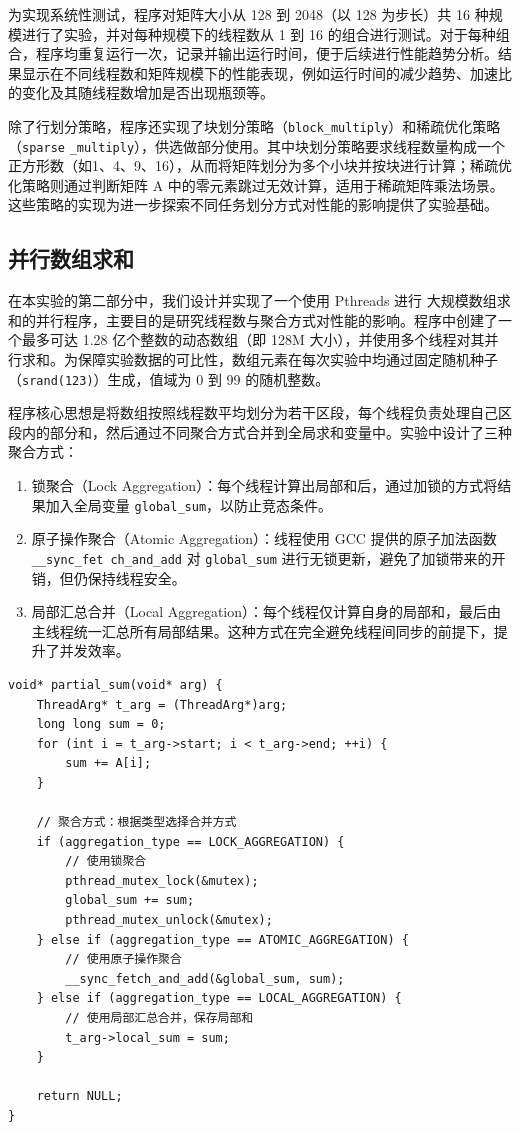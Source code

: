 \documentclass[a4paper, utf8]{ctexart}
\begin{document}
	为实现系统性测试，程序对矩阵大小从 128 到 2048（以 128 为步长）共 16 种规模进行了实验，并对每种规模下的线程数从 1 到 16 的组合进行测试。对于每种组合，程序均重复运行一次，记录并输出运行时间，便于后续进行性能趋势分析。结果显示在不同线程数和矩阵规模下的性能表现，例如运行时间的减少趋势、加速比的变化及其随线程数增加是否出现瓶颈等。
	
	除了行划分策略，程序还实现了块划分策略（\verb|block_multiply|）和稀疏优化策略（\verb|sparse| \verb|_multiply|），供选做部分使用。其中块划分策略要求线程数量构成一个正方形数（如1、4、9、16），从而将矩阵划分为多个小块并按块进行计算；稀疏优化策略则通过判断矩阵 A 中的零元素跳过无效计算，适用于稀疏矩阵乘法场景。这些策略的实现为进一步探索不同任务划分方式对性能的影响提供了实验基础。
	
	\subsection{并行数组求和}
	
	在本实验的第二部分中，我们设计并实现了一个使用 Pthreads 进行 大规模数组求和的并行程序，主要目的是研究线程数与聚合方式对性能的影响。程序中创建了一个最多可达 1.28 亿个整数的动态数组（即 128M 大小），并使用多个线程对其并行求和。为保障实验数据的可比性，数组元素在每次实验中均通过固定随机种子（\verb|srand(123)|）生成，值域为 0 到 99 的随机整数。
	
	程序核心思想是将数组按照线程数平均划分为若干区段，每个线程负责处理自己区段内的部分和，然后通过不同聚合方式合并到全局求和变量中。实验中设计了三种聚合方式：
	
	\begin{enumerate}[itemsep=2pt, topsep=0pt, parsep=0pt]
		\item 锁聚合（Lock Aggregation）：每个线程计算出局部和后，通过加锁的方式将结果加入全局变量 \verb|global_sum|，以防止竞态条件。
		\item 原子操作聚合（Atomic Aggregation）：线程使用 GCC 提供的原子加法函数 \verb|__sync_fet|\ \verb|ch_and_add| 对 \verb|global_sum| 进行无锁更新，避免了加锁带来的开销，但仍保持线程安全。
		\item 局部汇总合并（Local Aggregation）：每个线程仅计算自身的局部和，最后由主线程统一汇总所有局部结果。这种方式在完全避免线程间同步的前提下，提升了并发效率。
	\end{enumerate}
	
	\begin{verbatim}
void* partial_sum(void* arg) {
    ThreadArg* t_arg = (ThreadArg*)arg;
    long long sum = 0;
    for (int i = t_arg->start; i < t_arg->end; ++i) {
        sum += A[i];
    }

    // 聚合方式：根据类型选择合并方式
    if (aggregation_type == LOCK_AGGREGATION) {
        // 使用锁聚合
        pthread_mutex_lock(&mutex);
        global_sum += sum;
        pthread_mutex_unlock(&mutex);
    } else if (aggregation_type == ATOMIC_AGGREGATION) {
        // 使用原子操作聚合
        __sync_fetch_and_add(&global_sum, sum);
    } else if (aggregation_type == LOCAL_AGGREGATION) {
        // 使用局部汇总合并，保存局部和
        t_arg->local_sum = sum;
    }

    return NULL;
}
	\end{verbatim}
	
\end{document}
